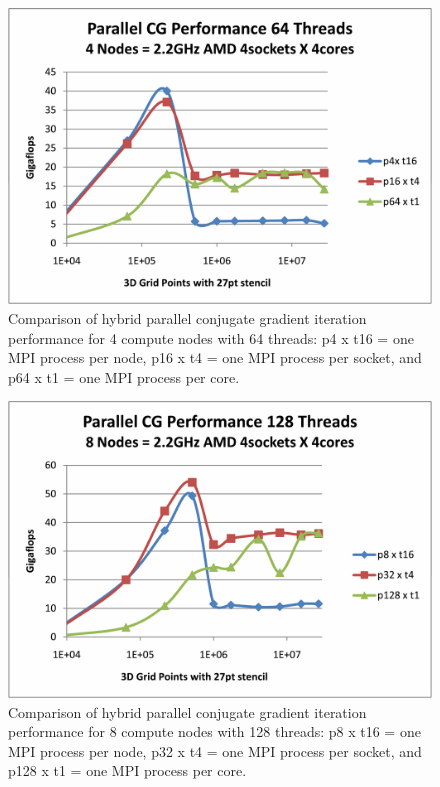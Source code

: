\begin{figure}[h]
\center
\includegraphics[viewport=1in 0.5in 8.5in 6.5in,angle=0,scale=0.5]{figures/test-hhpccg-intel-11-1-mpi-exe-np4-no-overlap-2}
\caption{Comparison of hybrid parallel conjugate gradient iteration performance for 4 compute nodes with 64 threads: p4 x t16 = one MPI process per node, p16 x t4 = one MPI process per socket, and p64 x t1 = one MPI process per core.}
\label{fig:CGPerf:np4}
\end{figure}

\begin{figure}[h]
\center
\includegraphics[viewport=1in 0.5in 8.5in 6.5in,angle=0,scale=0.5]{figures/test-hhpccg-intel-11-1-mpi-exe-np8-no-overlap-2}
\caption{Comparison of hybrid parallel conjugate gradient iteration performance for 8 compute nodes with 128 threads: p8 x t16 = one MPI process per node, p32 x t4 = one MPI process per socket, and p128 x t1 = one MPI process per core.}
\label{fig:CGPerf:np8}
\end{figure}

